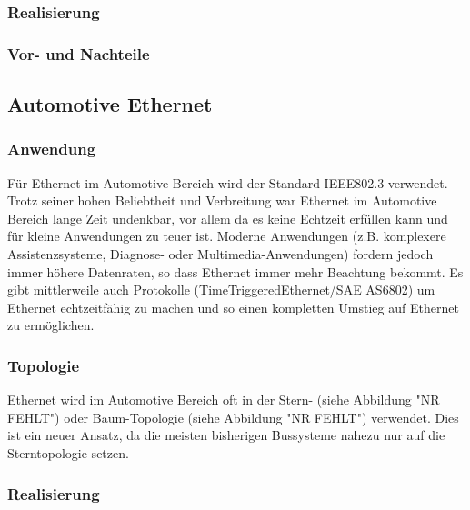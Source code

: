 \subsubsection{Realisierung}
\subsubsection{Vor- und Nachteile}

\subsection{Automotive Ethernet}
\subsubsection{Anwendung}
Für Ethernet im Automotive Bereich wird der Standard IEEE802.3 verwendet. Trotz seiner hohen Beliebtheit und Verbreitung war Ethernet im Automotive Bereich lange Zeit undenkbar, vor allem da es keine Echtzeit erfüllen kann und für kleine Anwendungen zu teuer ist. Moderne Anwendungen (z.B. komplexere Assistenzsysteme, Diagnose- oder Multimedia-Anwendungen) fordern jedoch immer höhere Datenraten, so dass Ethernet immer mehr Beachtung bekommt. Es gibt mittlerweile auch Protokolle (TimeTriggeredEthernet/SAE AS6802) um Ethernet echtzeitfähig zu machen und so einen kompletten Umstieg auf Ethernet zu ermöglichen.


\subsubsection{Topologie}
Ethernet wird im Automotive Bereich oft in der Stern- (siehe Abbildung "NR FEHLT") oder Baum-Topologie (siehe Abbildung "NR FEHLT") verwendet. Dies ist ein neuer Ansatz, da die meisten bisherigen Bussysteme nahezu nur auf die Sterntopologie setzen.


\subsubsection{Realisierung}
